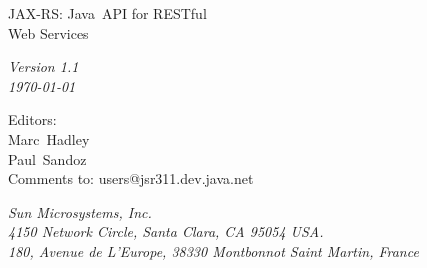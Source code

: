 \begin{titlepage}
\raggedleft

\vspace*{60pt}

{\Huge
\textsf{JAX-RS: Java\texttrademark\ API for RESTful\\\vspace{10pt}
 Web Services}}

\vspace{20pt}

{
\Large\textit{Version 1.1\\
\today}
}

\vspace{40pt}

{\large Editors:\\
Marc\ Hadley\\
Paul\ Sandoz\\
\vspace{10pt}Comments to: users@jsr311.dev.java.net
}

\vspace{80pt}

{\small\textit{Sun Microsystems, Inc.\\
4150 Network Circle, Santa Clara, CA 95054 USA.\\
180, Avenue de L'Europe, 38330 Montbonnot Saint Martin, France}
}
\end{titlepage} 
